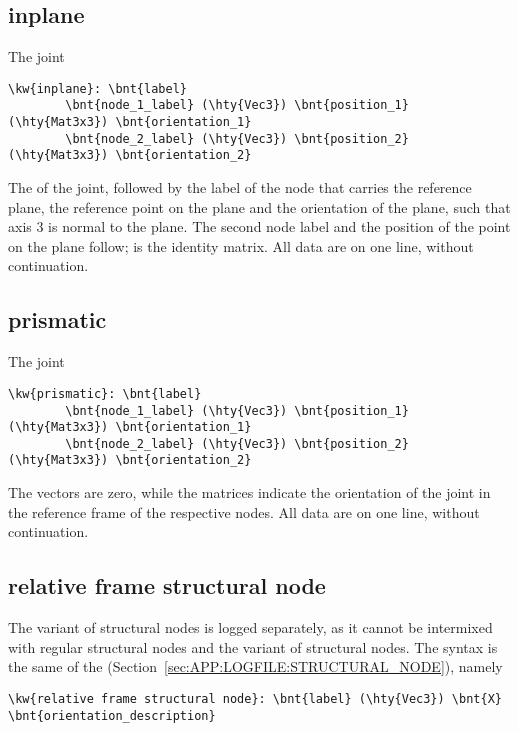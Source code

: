 \subsection{inplane}
The  joint
\begin{Verbatim}[commandchars=\\\{\}]
    \kw{inplane}: \bnt{label}
        \bnt{node_1_label} (\hty{Vec3}) \bnt{position_1} (\hty{Mat3x3}) \bnt{orientation_1}
        \bnt{node_2_label} (\hty{Vec3}) \bnt{position_2} (\hty{Mat3x3}) \bnt{orientation_2}
\end{Verbatim}
The  of the joint, followed by the label of the node
that carries the reference plane, the reference point 
on the plane and the orientation  of the plane,
such that axis 3 is normal to the plane.
The second node label and the position of the point on the plane
follow;  is the identity matrix.
All data are on one line, without continuation.

\subsection{prismatic}
The  joint
\begin{Verbatim}[commandchars=\\\{\}]
    \kw{prismatic}: \bnt{label}
        \bnt{node_1_label} (\hty{Vec3}) \bnt{position_1} (\hty{Mat3x3}) \bnt{orientation_1}
        \bnt{node_2_label} (\hty{Vec3}) \bnt{position_2} (\hty{Mat3x3}) \bnt{orientation_2}
\end{Verbatim}
The  vectors are zero,
while the  matrices indicate the orientation 
of the joint in the reference frame of the respective nodes.
All data are on one line, without continuation.

\subsection{relative frame structural node}
The  variant of  structural nodes
is logged separately, as it cannot be intermixed with regular structural nodes
and the  variant of  structural nodes.
The syntax is the same of the 
(Section~\ref{sec:APP:LOGFILE:STRUCTURAL_NODE}), namely
\begin{Verbatim}[commandchars=\\\{\}]
    \kw{relative frame structural node}: \bnt{label} (\hty{Vec3}) \bnt{X} \bnt{orientation_description}
\end{Verbatim}

